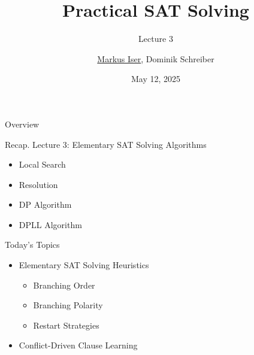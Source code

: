 \documentclass[t]{sdqbeamer2}
\title{Practical SAT Solving}
\subtitle{Lecture 3 \unimp{\normalfont -- Elementary SAT Solving Heuristics, Conflict-Driven Clause Learning}}
\author{\underline{Markus Iser}, Dominik Schreiber}
\date{May 12, 2025}
\begin{document}
\begin{frame}[title white horizontal, picture=logos/blender-render, kitlogo=rgb]
	\titlepage
\end{frame}

\begin{frame}{Overview}
	\begin{block}{Recap. Lecture 3: Elementary SAT Solving Algorithms}
		\begin{itemize}\setlength{\itemsep}{1ex}
			\item Local Search
			\item Resolution
			\item DP Algorithm
			\item DPLL Algorithm
		\end{itemize}
	\end{block}
	\pause
	\begin{block}{Today's Topics}
		\begin{itemize}\setlength{\itemsep}{1ex}
			\item Elementary SAT Solving Heuristics
			\begin{itemize}
				\item Branching Order
				\item Branching Polarity
				\item Restart Strategies
			\end{itemize}
			\item Conflict-Driven Clause Learning
		\end{itemize}
	\end{block}
\end{frame}
\end{document}
